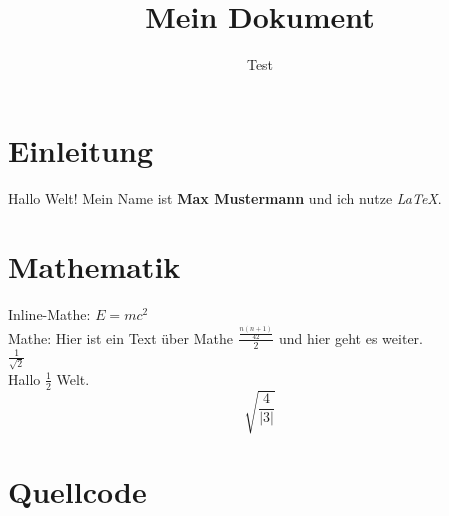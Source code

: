 \documentclass{article}
\title{Mein Dokument}
\author{Test}
\begin{document}
\maketitle

\section{Einleitung}
Hallo Welt!  
Mein Name ist \textbf{Max Mustermann} und ich nutze \textit{LaTeX}.

\section{Mathematik}
Inline-Mathe: $E = mc^2$  \\
Mathe: Hier ist ein Text über Mathe \(\frac{\frac{n(n+1)}{ 42}}{ 2}\) und hier geht es weiter.\\  



\(\frac{1}{ \sqrt{2}}\) \\



Hallo \(\frac{1}{ 2}\) Welt.  
\[\sqrt{\frac{4}{ \left|3\right|}}\]



\section{Quellcode}

\begin{lstlisting}[language=c++]


\end{lstlisting}
\end{document}
